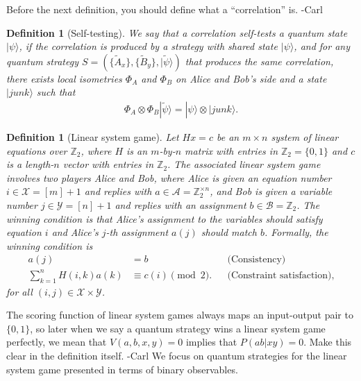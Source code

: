 \documentclass[11pt,letterpaper]{article}
\newcommand{\ket}[1]{|#1\rangle}
\newcommand{\x}{\otimes}
\newcommand{\Z}{\mathbb{Z}}
\newcommand{\calX}{\mathcal{X}}
\newcommand{\calY}{\mathcal{Y}}
\newcommand{\calA}{\mathcal{A}}
\newcommand{\calB}{\mathcal{B}}
\newcommand{\1}{\mathbb{1}}
\newcommand{\tA}{\tilde{A}}
\newcommand{\tB}{\tilde{B}}
\newcommand{\tpsi}{\tilde{\psi}}
\newcommand{\pr}[2]{P(#1|#2)}
\def\carl#1{{\color{blue} #1 -Carl}}
\newtheorem{definition}[theorem]{Definition}
\theoremstyle{definition}
\begin{document}
\carl{Before the next definition, you should define what a ``correlation'' is.}
\begin{definition}[Self-testing]
	We say that a correlation self-tests a quantum state $\ket{\psi}$, if 
	the correlation is produced by a strategy with shared state $\ket{\psi}$, and 
	for any quantum strategy $S = ( \{\tA_x\}, \{\tB_y\}, \ket{\tpsi})$ that produces the same correlation,
	there exists local isometries $\Phi_A$ and $\Phi_B$ on Alice and Bob's side and a state $\ket{junk}$ 
	such that 	
	\begin{align*}
		\Phi_A \x \Phi_B \ket{\tpsi} =  \ket{\psi} \x \ket{junk}.
	\end{align*}
\end{definition}
\begin{definition}[Linear system game]
 Let $Hx = c$ be an $m \times n$ system of linear equations over $\Z_2$,
 where $H$ is an $m$-by-$n$ matrix with entries in $\Z_2 = \{0,1\}$ and 
 $c$ is a length-$n$ vector with entries in $\Z_2$. 
 The associated linear system game involves two
 players Alice and Bob, where Alice is given an equation number $i \in \calX = [m]+1$ and replies with $a \in \calA = \Z_2^{\times n}$,
 and Bob is given a variable number $j \in \calY = [n]+1$ and replies with an assignment $b \in \calB = \Z_2$. The winning condition is 
 that Alice's assignment to the variables should satisfy equation $i$ and Alice's $j$-th assignment $a(j)$ should match $b$.
 Formally, the winning condition is 
 \begin{align*}
 	a(j) &= b && \text{(Consistency)} \\
	\sum_{k= 1}^n H(i,k) a(k) &\equiv c(i) \pmod 2. &&\text{(Constraint satisfaction)},
 \end{align*}
 for all $(i,j) \in \calX \times \calY$. 
\end{definition}
The scoring function of linear system games always maps an input-output pair to $\{0,1\}$, 
so later when we say a quantum strategy wins a linear system game perfectly, we mean that 
$V(a,b,x,y) =0$ implies that $\pr{ab}{xy} = 0$.  \carl{Make this clear in the definition itself.}
We focus on quantum strategies for the linear system game presented in terms of binary observables.
\end{document}
